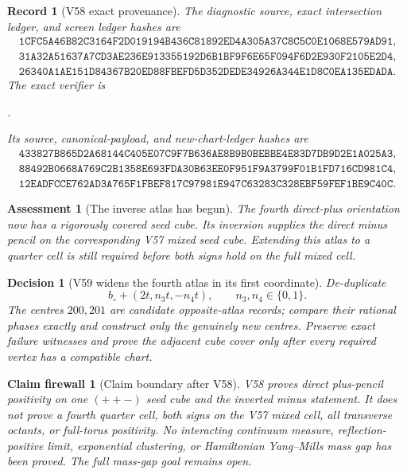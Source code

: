 \documentclass[11pt,oneside]{article}
\newtheorem{assessment}[theorem]{Assessment}
\newtheorem{firewall}[theorem]{Claim firewall}
\newtheorem{record}[theorem]{Record}
\newtheorem{decision}[theorem]{Decision}
\theoremstyle{definition}
\theoremstyle{remark}
\begin{document}
\begin{record}[V58 exact provenance]
\label{rec:newv58-provenance}
The diagnostic source, exact intersection ledger, and screen
ledger hashes are
\[
\begin{gathered}
\texttt{1CFC5A46B82C3164F2D019194B436C81892ED4A305A37C8C5C0E1068E579AD91},\\
\texttt{31A32A51637A7CD3AE236E913355192D6B1BF9F6E65F094F6D2E930F2105E2D4},\\
\texttt{26340A1AE151D84367B20ED88FBEFD5D352DEDE34926A344E1D8C0EA135EDADA}.
\end{gathered}                                         \tag{58.9}
\]
The exact verifier is
\begin{center}
\footnotesize
{}.
\end{center}
Its source, canonical-payload, and new-chart-ledger hashes are
\[
\begin{gathered}
\texttt{433827B865D2A68144C405E07C9F7B636AE8B9B0BEBBE4E83D7DB9D2E1A025A3},\\
\texttt{88492B0668A769C2B1358E693FDA30B63EE0F951F9A3799F01B1FD716CD981C4},\\
\texttt{12EADFCCE762AD3A765F1FBEF817C97981E947C63283C328EBF59FEF1BE9C40C}.
\end{gathered}                                         \tag{58.10}
\]
\end{record}

\begin{assessment}[The inverse atlas has begun]
\label{ass:newv58}
The fourth direct-plus orientation now has a rigorously covered
seed cube.  Its inversion supplies the direct minus pencil on the
corresponding V57 mixed seed cube.  Extending this atlas to a
quarter cell is still required before both signs hold on the full
mixed cell.
\end{assessment}

\begin{decision}[V59 widens the fourth atlas in its first coordinate]
\label{dec:newv58-next}
De-duplicate
\[
 b_\circ+(2t,n_3t,-n_4t),\qquad n_3,n_4\in\{0,1\}.   \tag{58.11}
\]
The centres \(200,201\) are candidate opposite-atlas records;
compare their rational phases exactly and construct only the
genuinely new centres.  Preserve exact failure witnesses and prove
the adjacent cube cover only after every required vertex has a
compatible chart.
\end{decision}

\begin{firewall}[Claim boundary after V58]
\label{fire:newv58-final}
V58 proves direct plus-pencil positivity on one \((++-)\) seed
cube and the inverted minus statement.  It does not prove a fourth
quarter cell, both signs on the V57 mixed cell, all transverse
octants, or full-torus positivity.  No interacting continuum
measure, reflection-positive limit, exponential clustering, or
Hamiltonian Yang--Mills mass gap has been proved.  The full
mass-gap goal remains open.
\end{firewall}
\end{document}
